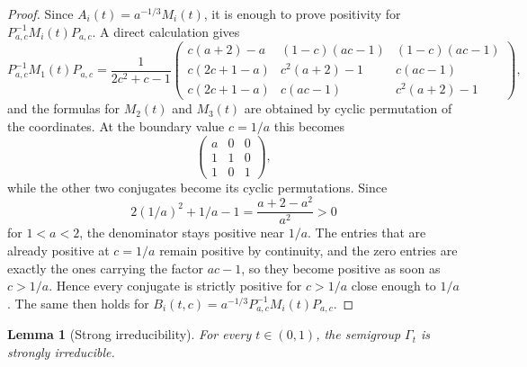 \documentclass[11pt]{amsart}
\newtheorem{lemma}[lemma]{Lemma}
\theoremstyle{definition}
\begin{document}
\begin{proof}
Since $A_i(t)=a^{-1/3}M_i(t)$, it is enough to prove positivity for $P_{a,c}^{-1}M_i(t)P_{a,c}$. A direct calculation gives
\[
P_{a,c}^{-1}M_1(t)P_{a,c}
=
\frac{1}{2c^2+c-1}
\begin{pmatrix}
c(a+2)-a & (1-c)(ac-1) & (1-c)(ac-1)\\
c(2c+1-a) & c^2(a+2)-1 & c(ac-1)\\
c(2c+1-a) & c(ac-1) & c^2(a+2)-1
\end{pmatrix},
\]
and the formulas for $M_2(t)$ and $M_3(t)$ are obtained by cyclic permutation of the coordinates. At the boundary value $c=1/a$ this becomes
\[
\begin{pmatrix}
a&0&0\\
1&1&0\\
1&0&1
\end{pmatrix},
\]
while the other two conjugates become its cyclic permutations. Since
\[
2(1/a)^2+1/a-1=\frac{a+2-a^2}{a^2}>0
\]
for $1<a<2$, the denominator stays positive near $1/a$. The entries that are already positive at $c=1/a$ remain positive by continuity, and the zero entries are exactly the ones carrying the factor $ac-1$, so they become positive as soon as $c>1/a$. Hence every conjugate is strictly positive for $c>1/a$ close enough to $1/a$. The same then holds for $B_i(t,c)=a^{-1/3}P_{a,c}^{-1}M_i(t)P_{a,c}$.
\end{proof}

\begin{lemma}[Strong irreducibility]\label{lem:strongirr}
For every $t\in(0,1)$, the semigroup $\Gamma_t$ is strongly irreducible.
\end{lemma}
\end{document}
